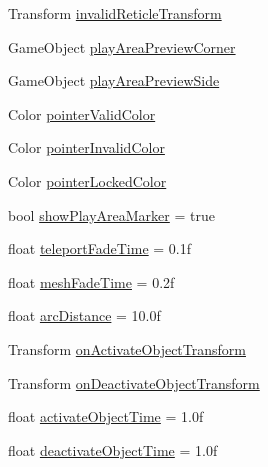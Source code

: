 \begin{DoxyCompactItemize}
\item 
Transform \mbox{\hyperlink{class_valve_1_1_v_r_1_1_interaction_system_1_1_teleport_abc8315f1e2981b11571481b4d4559a62}{invalid\+Reticle\+Transform}}
\item 
Game\+Object \mbox{\hyperlink{class_valve_1_1_v_r_1_1_interaction_system_1_1_teleport_aca4bac0a619126bf3d0f5e6406c28c9c}{play\+Area\+Preview\+Corner}}
\item 
Game\+Object \mbox{\hyperlink{class_valve_1_1_v_r_1_1_interaction_system_1_1_teleport_aef7189c52eb6539ed4178c06b1eb31f1}{play\+Area\+Preview\+Side}}
\item 
Color \mbox{\hyperlink{class_valve_1_1_v_r_1_1_interaction_system_1_1_teleport_a589f61af6406c6335a22149c9e4747bb}{pointer\+Valid\+Color}}
\item 
Color \mbox{\hyperlink{class_valve_1_1_v_r_1_1_interaction_system_1_1_teleport_a459e25d333467a300092ea54f38e62fc}{pointer\+Invalid\+Color}}
\item 
Color \mbox{\hyperlink{class_valve_1_1_v_r_1_1_interaction_system_1_1_teleport_a344ff26480b06c4abaf81884adf4362c}{pointer\+Locked\+Color}}
\item 
bool \mbox{\hyperlink{class_valve_1_1_v_r_1_1_interaction_system_1_1_teleport_ae237df145bd121d864832ba885676200}{show\+Play\+Area\+Marker}} = true
\item 
float \mbox{\hyperlink{class_valve_1_1_v_r_1_1_interaction_system_1_1_teleport_a6ab68fe982172e649ee8438472402cde}{teleport\+Fade\+Time}} = 0.\+1f
\item 
float \mbox{\hyperlink{class_valve_1_1_v_r_1_1_interaction_system_1_1_teleport_a576a3be154a844cd5364a884769516c0}{mesh\+Fade\+Time}} = 0.\+2f
\item 
float \mbox{\hyperlink{class_valve_1_1_v_r_1_1_interaction_system_1_1_teleport_aff7dfb05be719936d3842c4162f78a1f}{arc\+Distance}} = 10.\+0f
\item 
Transform \mbox{\hyperlink{class_valve_1_1_v_r_1_1_interaction_system_1_1_teleport_ab311e8678e1b25f9a717a4267207b311}{on\+Activate\+Object\+Transform}}
\item 
Transform \mbox{\hyperlink{class_valve_1_1_v_r_1_1_interaction_system_1_1_teleport_af81787c99cf1ef12efe9dae417fecc03}{on\+Deactivate\+Object\+Transform}}
\item 
float \mbox{\hyperlink{class_valve_1_1_v_r_1_1_interaction_system_1_1_teleport_a2899aebec29ef9944d2d4b47affc1cc2}{activate\+Object\+Time}} = 1.\+0f
\item 
float \mbox{\hyperlink{class_valve_1_1_v_r_1_1_interaction_system_1_1_teleport_aa34d103d8da25a6bc95921dcc9c70c12}{deactivate\+Object\+Time}} = 1.\+0f

\end{DoxyCompactItemize}
